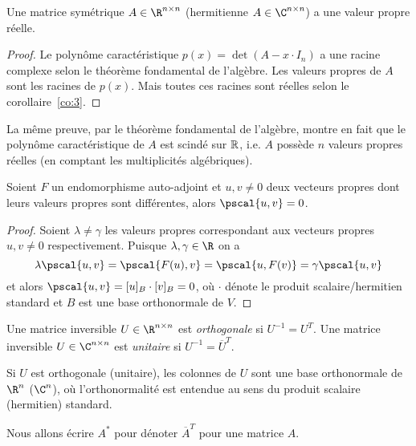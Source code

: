 \begin{corollary}
  \label{co:7}
  Une matrice symétrique $A \in \R^{n \times n}$ (hermitienne $A \in \C^{n \times n}$) a une valeur propre réelle. 
\end{corollary}

\begin{proof}
  Le polynôme caractéristique $p(x) = \det(A - x \cdot I_n)$ a une racine complexe selon le théorème fondamental de l'algèbre. Les valeurs propres de $A$ sont les racines de $p(x)$.  Mais toutes ces racines sont réelles selon le         corollaire~\ref{co:3}.  
\end{proof}

\begin{remark}
La même preuve, par le théorème fondamental de l'algèbre, montre en fait que le polynôme caractéristique de $A$ est scindé sur $\Bbb R$, i.e. $A$ possède $n$ valeurs propres réelles (en comptant les multiplicités algébriques).
\end{remark}

\begin{lemma}
  \label{lem:9}
  Soient $F$ un endomorphisme auto-adjoint et $u,v \neq 0$ deux vecteurs propres dont leurs valeurs propres  sont différentes, alors $\pscal{u,v}=0$. 
\end{lemma}

\begin{proof}
  Soient $\lambda \neq \gamma $ les valeurs propres correspondant aux vecteurs propres $u,v \neq 0$ respectivement. Puisque $\lambda,\gamma \in \R$ on a
  \begin{displaymath}
    \lambda \pscal{u,v} = \pscal{F(u),v} = \pscal{u,F(v)} = \gamma \pscal{u,v}
  \end{displaymath}
et alors $\pscal{u,v}=[u]_B \cdot [v]_B=0$, où $\cdot$ dénote le produit scalaire/hermitien standard et $B$ est une base orthonormale de $V$.  
\end{proof}



\begin{definition}
  \label{def:20}
  Une matrice inversible  $U \in \R^{n \times n}$ est \emph{orthogonale} si $ U^{-1}= U^T  $.  Une matrice inversible $U \in \C^{n \times n}$ est \emph{unitaire} si $U^{-1} = \overline{U}^T$. 
\end{definition}
\noindent 
Si $U$ est orthogonale (unitaire), les  colonnes de $U$ sont une base orthonormale de $\R^n$ ($\C^n$), où l'orthonormalité est entendue au sens du produit scalaire (hermitien) standard. 
\begin{notation}
Nous allons écrire $A^*$ pour dénoter $\overline{A}^T$ pour une matrice $A$.   
\end{notation}




